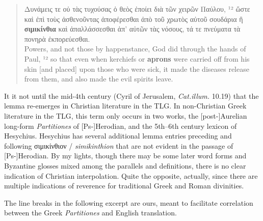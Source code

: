 \vspace*{3mm} 
 \begin{quote}Δυνάμεις τε οὐ τὰς τυχούσας ὁ θεὸς ἐποίει διὰ τῶν χειρῶν Παύλου, %
 ¹² ὥστε καὶ ἐπὶ τοὺς ἀσθενοῦντας ἀποφέρεσθαι ἀπὸ τοῦ χρωτὸς %
 αὐτοῦ σουδάρια ἢ \textbf{σιμικίνθια} καὶ ἀπαλλάσσεσθαι ἀπ’ αὐτῶν τὰς νόσους, %
 τά τε πνεύματα τὰ πονηρὰ ἐκπορεύεσθαι. \\[1mm] %
 Powers, and not those by happenstance, God did through the hands of Paul, %
 ¹² so that even when kerchiefs or \textbf{aprons} were carried off from his skin %
 [and placed] upon those who were sick, %
 it made the diseases release from them, %
 and also made the evil spirits leave.  \end{quote} %
 \vspace*{3mm} 
 
 It it not until the mid-4th century (Cyril of Jerusalem, \textit{Cat.illum.} 10.19) %
 that the lemma re-emerges in Christian literature in the TLG. %
 In non-Christian Greek literature in the TLG, %
 this term only occurs in two works, %
 the [post-]Aurelian long-form \textit{Partitiones} of [Ps-]Herodian, %
 and the 5th--6th century lexicon of Hesychius. %
Hesychius has several additional lemma entries preceding and following σιμικίνθιον / \textit{simikinthion} %
that are not evident in the passage of [Ps-]Herodian. %
By my lights, though there may be some later word forms and Byzantine glosses mixed among the parallels and definitions, %
there is no clear indication of Christian interpolation. %
Quite the opposite, actually, since there are multiple indications %
of reverence for traditional Greek and Roman divinities. \clearpage

The line breaks in the following excerpt are ours, %
meant to facilitate correlation between the Greek \textit{Partitiones} and English translation. %
\vspace*{2mm}

